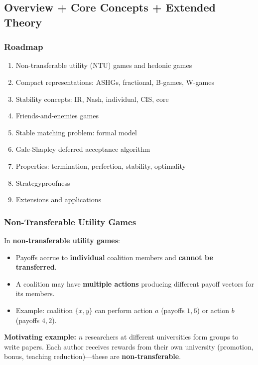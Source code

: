 \subsection{Overview + Core Concepts + Extended Theory}

\subsubsection*{Roadmap}
\begin{enumerate}
  \item Non-transferable utility (NTU) games and hedonic games
  \item Compact representations: ASHGs, fractional, B-games, W-games
  \item Stability concepts: IR, Nash, individual, CIS, core
  \item Friends-and-enemies games
  \item Stable matching problem: formal model
  \item Gale-Shapley deferred acceptance algorithm
  \item Properties: termination, perfection, stability, optimality
  \item Strategyproofness
  \item Extensions and applications
\end{enumerate}

\bigseparator

\subsubsection{Non-Transferable Utility Games}

\begin{defbox}
In \textbf{non-transferable utility games}:
\begin{itemize}
  \item Payoffs accrue to \textbf{individual} coalition members and \textbf{cannot be transferred}.
  \item A coalition may have \textbf{multiple actions} producing different payoff vectors for its members.
  \item Example: coalition $\{x, y\}$ can perform action $a$ (payoffs $1, 6$) or action $b$ (payoffs $4, 2$).
\end{itemize}

\textbf{Motivating example:} $n$ researchers at different universities form groups to write papers. Each author receives rewards from their own university (promotion, bonus, teaching reduction)---these are \textbf{non-transferable}.
\end{defbox}

